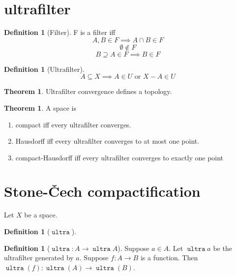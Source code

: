 \documentclass[10pt]{scrartcl}
\newcounter{thms}
\numberwithin{thms}{section}
\theoremstyle{definition}
\newtheorem{defn}[thms]{Definition}
\newtheorem{theorem}[thms]{Theorem}
\newcommand{\ultra}{\operatorname{\mathtt{ultra}}}
\begin{document}
\section{ultrafilter}
\begin{defn}[Filter]
  F is a filter iff
  \label{defn:filter}
  \begin{equation}
    \label{eq:filter-ax:finite-int}
    A,B\in F \implies A\cap B \in F
  \end{equation}
  \begin{equation}
    \label{eq:filter-ax:proper}
    \emptyset \notin F
  \end{equation}
  \begin{equation}
    \label{eq:filter-ax:upward-closed}
    B\supseteq A\in F \implies B\in F
  \end{equation}
\end{defn}

\begin{defn}[Ultrafilter]
  \begin{equation}
    \label{eq:ultra-ax}
    A\subseteq X \implies A \in U \textrm{ or } X-A\in U   
  \end{equation}
\end{defn}

\begin{theorem}
  Ultrafilter convergence defines a topology. 
\end{theorem}
\begin{theorem}
  A space is
  \begin{enumerate}
  \item compact iff every ultrafilter converges.
  \item Hausdorff iff every ultrafilter converges to at most one point.
  \item compact-Hausdorff iff every ultrafilter converges to exactly one
    point
  \end{enumerate}
\end{theorem}

\section{Stone-Čech compactification}
Let $X$ be a space. 
\begin{defn}[$\ultra$]

\end{defn}

\begin{defn}[$\ultra:A \to \ultra A$]
  Suppose $a\in A$. Let $\ultra a$ be the ultrafilter generated by $a$. Suppose $f:A\to B$ is a function. Then $\ultra (f):\ultra(A)\to\ultra(B)$. 
\end{defn}
\end{document}
